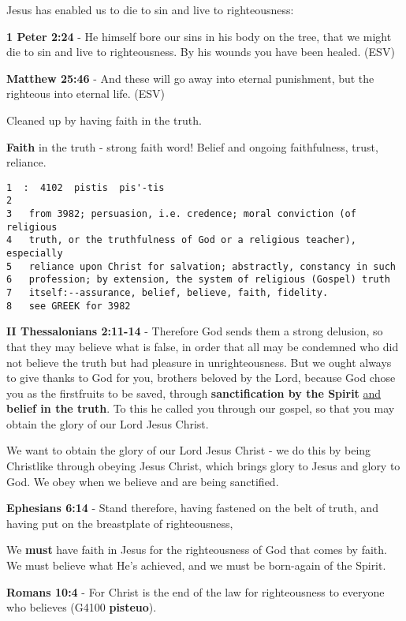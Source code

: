 \documentclass[11pt]{article}
\begin{document}
Jesus has enabled us to die to sin and live to righteousness:

\textbf{1 Peter 2:24} - He himself bore our sins in his body on the tree, that we might die to sin and live to righteousness.  By his wounds you have been healed.  (ESV)

\textbf{Matthew 25:46} - And these will go away into eternal punishment, but the righteous into eternal life. (ESV)

Cleaned up by having faith in the truth.

\textbf{Faith} in the truth - strong faith word! Belief and ongoing faithfulness, trust, reliance.

\begin{verbatim}
1  :  4102  pistis  pis'-tis
2  
3   from 3982; persuasion, i.e. credence; moral conviction (of religious
4   truth, or the truthfulness of God or a religious teacher), especially
5   reliance upon Christ for salvation; abstractly, constancy in such
6   profession; by extension, the system of religious (Gospel) truth
7   itself:--assurance, belief, believe, faith, fidelity.
8   see GREEK for 3982
\end{verbatim}

\textbf{II Thessalonians 2:11-14} - Therefore God sends them a strong delusion, so that they may believe what is false, in order that all may be condemned who did not believe the truth but had pleasure in unrighteousness. But we ought always to give thanks to God for you, brothers beloved by the Lord, because God chose you as the firstfruits to be saved, through \textbf{sanctification by the Spirit} \uline{and} \textbf{belief in the truth}. To this he called you through our gospel, so that you may obtain the glory of our Lord Jesus Christ.

We want to obtain the glory of our Lord Jesus Christ - we do this by being Christlike through obeying Jesus Christ, which brings glory to Jesus and glory to God. We obey when we believe and are being sanctified.

\textbf{Ephesians 6:14} - Stand therefore, having fastened on the belt of truth, and having put on the breastplate of righteousness,

We \textbf{must} have faith in Jesus for the righteousness of God that comes by faith.
We must believe what He's achieved, and we must be born-again of the Spirit.

\textbf{Romans 10:4} - For Christ is the end of the law for righteousness to everyone who believes (G4100 \textbf{pisteuo}).
\end{document}
